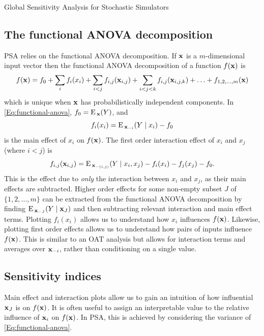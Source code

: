 \begin{chapter}{Global Sensitivity Analysis for Stochastic Simulators\label{Ch:sensitivity}}
\subsection{The functional ANOVA decomposition}
PSA relies on the functional ANOVA decomposition. If $\mathbf{x}$ is a $m$-dimensional input vector then the functional ANOVA decomposition of a function $f(\mathbf{x})$ is
\begin{equation}
 f(\mathbf{x}) = f_0 + \sum_i f_i(x_i) + \sum_{i < j} f_{i,j}(\mathbf{x}_{i,j}) + \sum_{i<j<k} f_{i,j}(\mathbf{x}_{i,j,k}) + \ldots + f_{1, 2, \dots, m}(\mathbf{x}) \label{Eq:functional-anova}
\end{equation}
which is unique when $\mathbf{x}$ has probabilistically independent components. In \cref{Eq:functional-anova}, $f_0 = \textrm{E}\,_{\mathbf{x}}(Y)$, and
\begin{equation}
    f_i(x_i) = \textrm{E}\,_{\mathbf{x}_{-i}} (Y \mid x_i ) - f_0
\end{equation}
is the main effect of $x_i$ on $f(\mathbf{x})$. The first order interaction effect of $x_i$ and $x_j$ (where $i<j$) is
\begin{equation}
    f_{i,j}(\mathbf{x}_{i,j}) = \textrm{E}\,_{\mathbf{x}_{-(i,j)}} (Y \mid x_i, x_j ) - f_i(x_i) - f_j(x_j) - f_0.
\end{equation}
This is the effect due to \textit{only} the interaction between $x_i$ and $x_j$, as their main effects are subtracted. Higher order effects for some non-empty subset $J$ of $\{1, 2, \ldots, m\}$ can be extracted from the functional ANOVA decomposition by finding $\textrm{E}\,_{\mathbf{x}_{-J}} (Y \mid \mathbf{x}_{J} )$ and then subtracting relevant interaction and main effect terms. Plotting $f_i(x_i)$ allows us to understand how $x_i$ influences $f(\mathbf{x})$. Likewise, plotting first order effects allows us to understand how pairs of inputs influence $f(\mathbf{x})$. This is similar to an OAT analysis but allows for interaction terms and averages over $\mathbf{x}_{-i}$, rather than conditioning on a single value.
\subsection{Sensitivity indices}
Main effect and interaction plots allow us to gain an intuition of how influential $\mathbf{x}_J$ is on $f(\mathbf{x})$. It is often useful to assign an interpretable value to the relative influence of $\mathbf{x}_i$ on $f(\mathbf{x})$. In PSA, this is achieved by considering the variance of \cref{Eq:functional-anova}.


\end{chapter}
